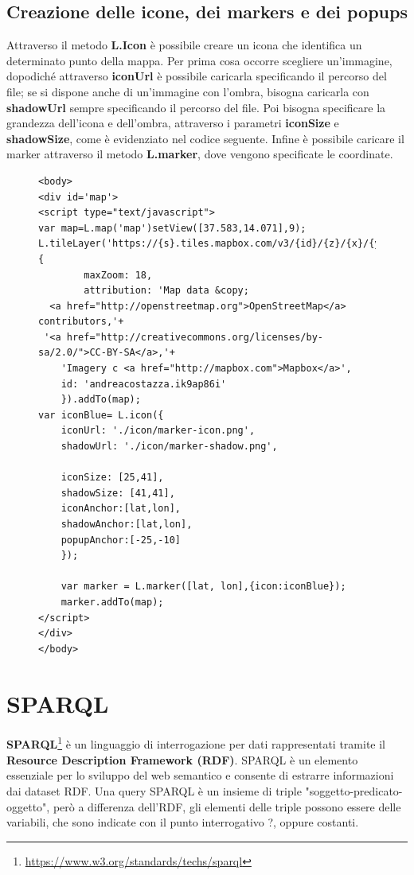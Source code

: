 \documentclass[a4paper,11pt]{article}
\begin{document}
\subsection{Creazione delle icone, dei markers e dei popups}
\label{sec:3.2}
Attraverso il metodo \textbf{L.Icon} è possibile creare un icona che identifica un determinato punto della mappa. Per prima cosa occorre scegliere un'immagine, dopodiché attraverso \textbf{iconUrl} è possibile caricarla specificando il percorso del file; se si dispone anche di un'immagine con l'ombra, bisogna caricarla con \textbf{shadowUrl} sempre specificando il percorso del file. Poi bisogna specificare la grandezza dell'icona e dell'ombra, attraverso i parametri \textbf{iconSize} e \textbf{shadowSize}, come è evidenziato nel codice seguente. Infine è possibile caricare il marker attraverso il metodo \textbf{L.marker}, dove vengono specificate le coordinate.
\begin{figure}[htb]
\begin{lstlisting}[style=htmlcssjs]
<body>		
<div id='map'>
<script type="text/javascript">
var map=L.map('map')setView([37.583,14.071],9);
L.tileLayer('https://{s}.tiles.mapbox.com/v3/{id}/{z}/{x}/{y}.png',{
        maxZoom: 18,
        attribution: 'Map data &copy; 
  <a href="http://openstreetmap.org">OpenStreetMap</a> contributors,'+
 '<a href="http://creativecommons.org/licenses/by-sa/2.0/">CC-BY-SA</a>,'+
	'Imagery c <a href="http://mapbox.com">Mapbox</a>',
	id: 'andreacostazza.ik9ap86i'
	}).addTo(map);
var iconBlue= L.icon({
	iconUrl: './icon/marker-icon.png',
	shadowUrl: './icon/marker-shadow.png',
			
	iconSize: [25,41],
	shadowSize: [41,41],
	iconAnchor:[lat,lon],
	shadowAnchor:[lat,lon],
	popupAnchor:[-25,-10]
	});
	
	var marker = L.marker([lat, lon],{icon:iconBlue});		
	marker.addTo(map);
</script>
</div>
</body>
\end{lstlisting}
\end{figure}

\newpage

\section{SPARQL}
\label{sec:4}
\textbf{SPARQL}\footnote{\url{https://www.w3.org/standards/techs/sparql}} è un linguaggio di interrogazione per dati rappresentati tramite il \textbf{Resource Description Framework (RDF)}.
SPARQL è un elemento essenziale per lo sviluppo del web semantico e consente di estrarre informazioni dai dataset RDF.\newline 
Una query SPARQL è un insieme di triple "soggetto-predicato-oggetto", però a differenza dell'RDF, gli elementi delle triple possono essere delle variabili, che sono indicate con il punto interrogativo ?, oppure costanti.
\end{document}

